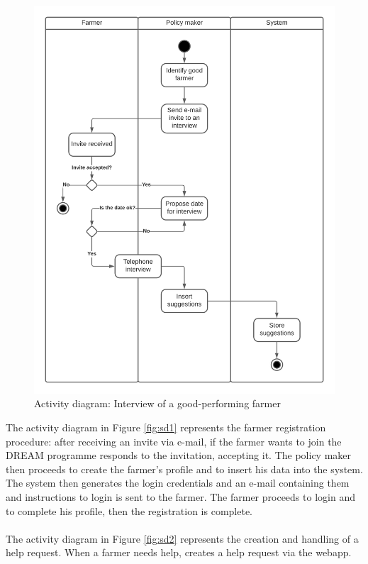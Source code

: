 \documentclass[10pt]{article}
\begin{document}
\begin{figure}[ht!]
    \centering
    \includegraphics[scale=0.48]{stateDiagrams/Interview.png}
    \caption{Activity diagram: Interview of a good-performing farmer}
    \label{fig:sd4}
\end{figure}
The activity diagram in Figure \ref{fig:sd1} represents the farmer registration procedure: after receiving an invite via e-mail, if the farmer wants to
join the DREAM programme responds to the invitation, accepting it. The policy maker then proceeds to create the farmer's profile and to insert his data into
the system. The system then generates the login credentials and an e-mail containing them and instructions to login is sent to the farmer. The farmer proceeds
to login and to complete his profile, then the registration is complete.\\\\
The activity diagram in Figure \ref{fig:sd2} represents the creation and handling of a help request. When a farmer needs help, creates a help request via the webapp.
\end{document}
